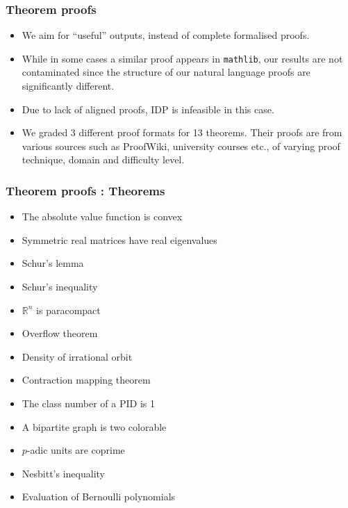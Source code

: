 \documentclass{beamer} %
\begin{document}
\begin{frame}
\frametitle{Theorem proofs}
\begin{itemize}
\item [\textbullet] We aim for ``useful'' outputs, instead of complete formalised proofs. \pause
\item [\textbullet]  While in some cases a similar proof appears in \texttt{mathlib}, our results are not contaminated since the structure of our natural language proofs are significantly different. \pause
\item [\textbullet] Due to lack of aligned proofs, IDP is infeasible in this case. \pause
\item [\textbullet] We graded 3 different proof formats for 13 theorems. Their proofs are from various
sources such as ProofWiki, university courses etc., of varying proof technique, domain and difficulty
level.
\end{itemize}
\end{frame}
\begin{frame}
\frametitle{Theorem proofs : Theorems}
\begin{itemize}
\item [\textbullet] The absolute value function is convex 
\item [\textbullet] Symmetric real matrices have real eigenvalues
\item [\textbullet] Schur's lemma
\item [\textbullet] Schur's inequality
\item [\textbullet] $\mathbb{R}^n$ is paracompact
\item [\textbullet] Overflow theorem
\item [\textbullet] Density of irrational orbit
\item [\textbullet] Contraction mapping theorem
\item [\textbullet] The class number of a PID is 1
\item [\textbullet] A bipartite graph is two colorable
\item [\textbullet] $p$-adic units are coprime
\item [\textbullet] Nesbitt's inequality
\item [\textbullet] Evaluation of Bernoulli polynomials
\end{itemize}
\end{frame}
\end{document}
